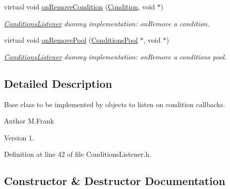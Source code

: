 \begin{DoxyCompactItemize}
virtual void \hyperlink{class_d_d4hep_1_1_conditions_1_1_conditions_listener_ab0c021c6ef8e6c47f28dd077220ee1f3}{on\+Remove\+Condition} (\hyperlink{class_d_d4hep_1_1_conditions_1_1_condition}{Condition}, void $\ast$)
\begin{DoxyCompactList}\small\item\em \hyperlink{class_d_d4hep_1_1_conditions_1_1_conditions_listener}{Conditions\+Listener} dummy implementation\+: on\+Remove a condition. \end{DoxyCompactList}\item 
virtual void \hyperlink{class_d_d4hep_1_1_conditions_1_1_conditions_listener_aadd6949fa8606ac66cab08494ab79412}{on\+Remove\+Pool} (\hyperlink{class_d_d4hep_1_1_conditions_1_1_conditions_pool}{Conditions\+Pool} $\ast$, void $\ast$)
\begin{DoxyCompactList}\small\item\em \hyperlink{class_d_d4hep_1_1_conditions_1_1_conditions_listener}{Conditions\+Listener} dummy implementation\+: on\+Remove a conditions pool. \end{DoxyCompactList}\end{DoxyCompactItemize}


\subsection{Detailed Description}
Base class to be implemented by objects to listen on condition callbacks. 

\begin{DoxyAuthor}{Author}
M.\+Frank 
\end{DoxyAuthor}
\begin{DoxyVersion}{Version}
1. 
\end{DoxyVersion}


Definition at line 42 of file Conditions\+Listener.\+h.



\subsection{Constructor \& Destructor Documentation}
\hypertarget{class_d_d4hep_1_1_conditions_1_1_conditions_listener_a3045043973d530d2c01ccb26462a8795}{}\label{class_d_d4hep_1_1_conditions_1_1_conditions_listener_a3045043973d530d2c01ccb26462a8795} 
